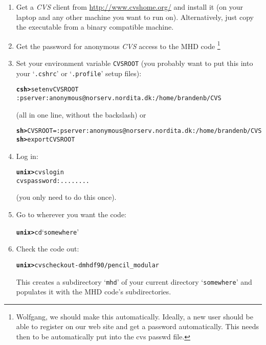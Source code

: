 \documentclass[12pt,twoside,notitlepage,a4paper]{article}
\makeatletter
\newcommand{\prompt}[1]{{\ttfamily\bfseries{}#1}}
\newcommand{\code}[1]{\texttt{#1}}
\newcommand{\env}[1]{\code{#1}\index{#1@\emph{#1}}}
\newcommand{\file}[1]{`\texttt{#1}'}
\newcommand{\name}[1]{\textsl{#1}\index{#1}\/}
\newcommand{\bcks}{{\symbol{92}}}
\newcommand{\bs}{\bcks}       %
\makeatother
\begin{document}
\begin{enumerate}

\item Get a \name{CVS} client from \url{http://www.cvshome.org/} and
  install it (on your laptop and any other machine you want to run on).
  Alternatively, just copy the executable from a binary compatible
  machine.

\item Get the password for anonymous \name{CVS} access to the MHD code
\footnote{Wolfgang, we should make this automatically. Ideally, a new user
should be able to register on our web site and get a password automatically.
This needs then to be automatically put into the cvs passwd file.}

\item Set your environment variable \env{CVSROOT} (you probably want to
  put this into your \file{.cshrc} or \file{.profile} setup files):
  \begin{alltt}
  \prompt{csh> } setenv CVSROOT \bs
        :pserver:anonymous@norserv.nordita.dk:/home/brandenb/CVS \
  \end{alltt}
  (all in one line, without the backslash) or
  \begin{alltt}
  \prompt{sh> } CVSROOT=:pserver:anonymous@norserv.nordita.dk:/home/brandenb/CVS
  \prompt{sh> } export CVSROOT \
  \end{alltt}

\item Log in:
  \begin{alltt}
  \prompt{unix> } cvs login
  cvs password: ........ \
\end{alltt}
(you only need to do this once).

\item Go to wherever you want the code:
  \begin{alltt}
  \prompt{unix> } cd \file{somewhere} \
  \end{alltt}

\item Check the code out:
  \begin{alltt}
  \prompt{unix> } cvs checkout -d mhd f90/pencil_modular \
  \end{alltt} 
  This creates a subdirectory \file{mhd} of your current directory
  \file{somewhere} and populates it with the MHD code's subdirectories.

\end{enumerate}


\end{document}
